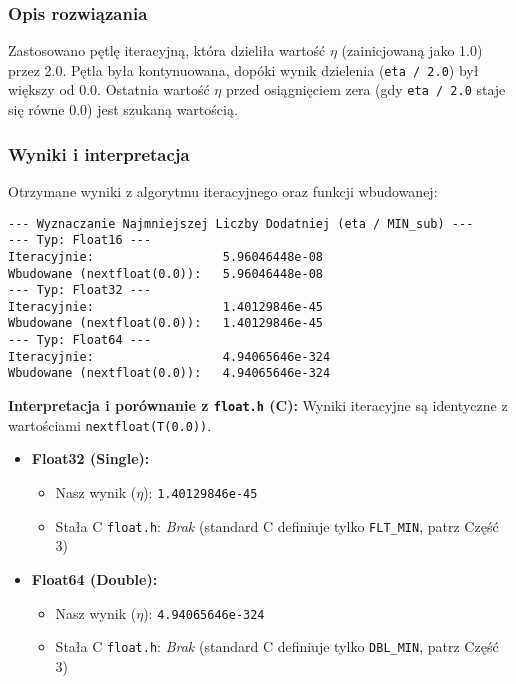 \documentclass[12pt,a4paper]{article}
\begin{document}
\subsubsection{Opis rozwiązania}
Zastosowano pętlę iteracyjną, która dzieliła wartość $\eta$ (zainicjowaną jako 1.0) przez 2.0. Pętla była kontynuowana, dopóki wynik dzielenia (\texttt{eta / 2.0}) był większy od 0.0. Ostatnia wartość $\eta$ przed osiągnięciem zera (gdy \texttt{eta / 2.0} staje się równe 0.0) jest szukaną wartością.

\subsubsection{Wyniki i interpretacja}
Otrzymane wyniki z algorytmu iteracyjnego oraz funkcji wbudowanej:
\begin{verbatim}
--- Wyznaczanie Najmniejszej Liczby Dodatniej (eta / MIN_sub) ---
--- Typ: Float16 ---
Iteracyjnie:                  5.96046448e-08
Wbudowane (nextfloat(0.0)):   5.96046448e-08
--- Typ: Float32 ---
Iteracyjnie:                  1.40129846e-45
Wbudowane (nextfloat(0.0)):   1.40129846e-45
--- Typ: Float64 ---
Iteracyjnie:                  4.94065646e-324
Wbudowane (nextfloat(0.0)):   4.94065646e-324
\end{verbatim}

\noindent \textbf{Interpretacja i porównanie z \texttt{float.h} (C):}
Wyniki iteracyjne są identyczne z wartościami \texttt{nextfloat(T(0.0))}.
\begin{minipage}{\textwidth} %
\begin{itemize}
    \item \textbf{Float32 (Single):}
    \begin{itemize}
        \item Nasz wynik ($\eta$): \texttt{1.40129846e-45}
        \item Stała C \texttt{float.h}: \textit{Brak} (standard C definiuje tylko \texttt{FLT\_MIN}, patrz Część 3)
    \end{itemize}
    \item \textbf{Float64 (Double):}
    \begin{itemize}
        \item Nasz wynik ($\eta$): \texttt{4.94065646e-324}
        \item Stała C \texttt{float.h}: \textit{Brak} (standard C definiuje tylko \texttt{DBL\_MIN}, patrz Część 3)
    \end{itemize}
\end{itemize}
\end{minipage} %
\end{document}
